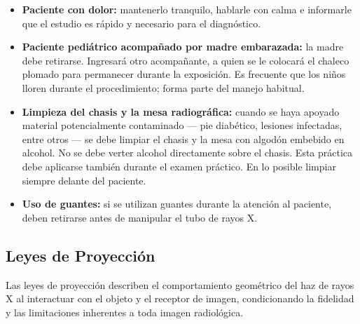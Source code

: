	\begin{itemize}
		\item \textbf{Paciente con dolor:} mantenerlo tranquilo, hablarle con
		calma e informarle que el estudio es rápido y necesario para el
		diagnóstico.
		
		\item \textbf{Paciente pediátrico acompañado por madre embarazada:}
		la madre debe retirarse. Ingresará otro acompañante, a quien se le
		colocará el chaleco plomado para permanecer durante la exposición.
		Es frecuente que los niños lloren durante el procedimiento; forma
		parte del manejo habitual.
		
		\item \textbf{Limpieza del chasis y la mesa radiográfica:} cuando se
		haya apoyado material potencialmente contaminado --- pie diabético,
		lesiones infectadas, entre otros --- se debe limpiar el chasis y la
		mesa con algodón embebido en alcohol. No se debe verter alcohol
		directamente sobre el chasis. Esta práctica debe aplicarse también
		durante el examen práctico. En lo posible limpiar siempre delante
		del paciente.
		
		\item \textbf{Uso de guantes:} si se utilizan guantes durante la
		atención al paciente, deben retirarse antes de manipular el tubo de
		rayos X.
	\end{itemize}
	
	\clearpage
	
	\subsection{Leyes de Proyección}
	
	Las leyes de proyección describen el comportamiento geométrico del haz de rayos X
	al interactuar con el objeto y el receptor de imagen, condicionando la fidelidad
	y las limitaciones inherentes a toda imagen radiológica.
	
